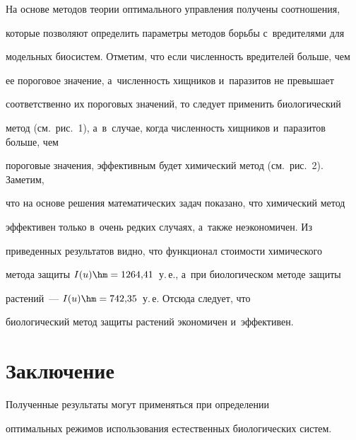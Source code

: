 На основе методов теории оптимального управления получены соотношения, 


которые позволяют определить параметры методов борьбы с~вредителями для 


модельных биосистем. Отметим, что если численность вредителей больше, чем 


ее пороговое значение, а~численность хищников и~паразитов не превышает 


соответственно их пороговых значений, то следует применить биологический 


метод (см.\ рис.~1), а~в~случае, когда численность хищников и~паразитов больше, чем 


пороговые значения, эффективным будет химический метод (см.\ рис.~2). Заметим, 


что на основе решения математических задач показано, что химический метод 


эффективен только в~очень редких случаях, а~также неэкономичен. Из 


приведенных результатов видно, что функционал стоимости химического 


метода защиты $I(u)\hm=1264{,}41$~у.\,е., а~при биологическом методе защиты 


растений~---  $I(u)\hm= 742{,}35$~у.\,е. Отсюда следует, что 


биологический метод защиты растений экономичен и~эффективен. 





\section{Заключение}





     Полученные результаты могут применяться при определении 


оптимальных режимов использования естественных биологических систем. 


     


